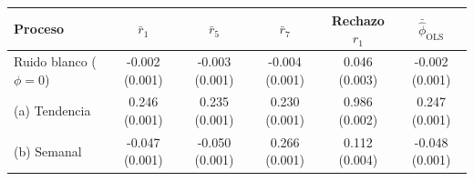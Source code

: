 \begin{tabular}{lccccc}
\toprule
Proceso & $\bar r_1$ & $\bar r_5$ & $\bar r_7$ & Rechazo $r_1$ & $\bar{\hat\phi}_{\text{OLS}}$ \\
\midrule
Ruido blanco ($\phi=0$) & -0.002 (0.001) & -0.003 (0.001) & -0.004 (0.001) & 0.046 (0.003) & -0.002 (0.001) \\
(a) Tendencia & 0.246 (0.001) & 0.235 (0.001) & 0.230 (0.001) & 0.986 (0.002) & 0.247 (0.001) \\
(b) Semanal & -0.047 (0.001) & -0.050 (0.001) & 0.266 (0.001) & 0.112 (0.004) & -0.048 (0.001) \\
\bottomrule
\end{tabular}
